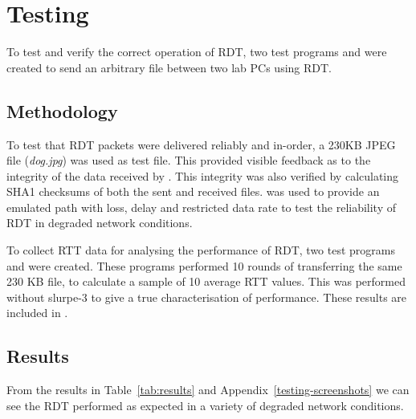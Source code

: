 \section{Testing}

To test and verify the correct operation of RDT, two test programs  and  were created to send an arbitrary file between two lab PCs using RDT. 

\subsection{Methodology}

To test that RDT packets were delivered reliably and in-order, a 230KB JPEG file (\emph{dog.jpg}) was used as test file. This provided visible feedback as to the integrity of the data received by . This integrity was also verified by calculating SHA1 checksums of both the sent and received files.  was used to provide an emulated path with loss, delay and restricted data rate to test the reliability of RDT in degraded network conditions.

To collect RTT data for analysing the performance of RDT, two test programs  and  were created. These programs performed 10 rounds of transferring the same 230 KB file, to calculate a sample of 10 average RTT values. This was performed without slurpe-3 to give a true characterisation of performance. These results are included in .

\subsection{Results}

From the results in Table~\ref{tab:results} and Appendix~\ref{testing-screenshots} we can see the RDT performed as expected in a variety of degraded network conditions. 

